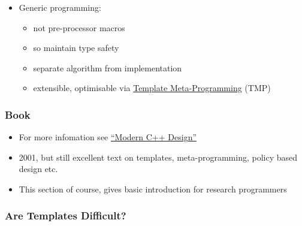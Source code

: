 \begin{itemize}
\tightlist
\item
  Generic programming:

  \begin{itemize}
  \tightlist
  \item
    not pre-processor macros
  \item
    so maintain type safety
  \item
    separate algorithm from implementation
  \item
    extensible, optimisable via \href{97TemplateMetaProg}{Template
    Meta-Programming} (TMP)
  \end{itemize}
\end{itemize}

\hypertarget{book}{%
\subsubsection{Book}\label{book}}

\begin{itemize}
\tightlist
\item
  For more infomation see
  \href{http://erdani.com/index.php/books/modern-c-design/}{``Modern C++
  Design''}
\item
  2001, but still excellent text on templates, meta-programming, policy
  based design etc.
\item
  This section of course, gives basic introduction for research
  programmers
\end{itemize}

\hypertarget{are-templates-difficult}{%
\subsubsection{Are Templates Difficult?}\label{are-templates-difficult}}

